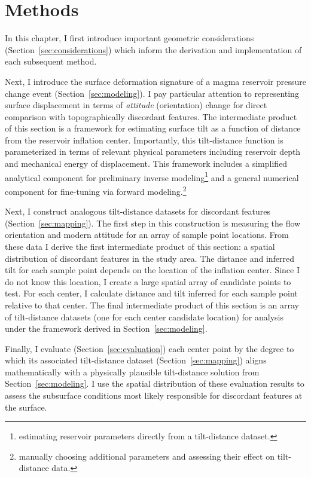 \chapter{Methods}\label{cha:methods}

In this chapter, I first introduce important geometric considerations (Section~\ref{sec:considerations}) which inform the derivation and implementation of each subsequent method.

Next, I introduce the surface deformation signature of a magma reservoir pressure change event (Section~\ref{sec:modeling}). I pay particular attention to representing surface displacement in terms of \emph{attitude} (orientation) change for direct comparison with topographically discordant features. The intermediate product of this section is a framework for estimating surface tilt as a function of distance from the reservoir inflation center. Importantly, this tilt-distance function is parameterized in terms of relevant physical parameters including reservoir depth and mechanical energy of displacement. This framework includes a simplified analytical component for preliminary inverse modeling\footnote{estimating reservoir parameters directly from a tilt-distance dataset.} and a general numerical component for fine-tuning via forward modeling.\footnote{manually choosing additional parameters and assessing their effect on tilt-distance data.}

Next, I construct analogous tilt-distance datasets for discordant features (Section~\ref{sec:mapping}). The first step in this construction is measuring the flow orientation and modern attitude for an array of sample point locations. From these data I derive the first intermediate product of this section: a spatial distribution of discordant features in the study area. The distance and inferred tilt for each sample point depends on the location of the inflation center. Since I do not know this location, I create a large spatial array of candidate points to test. For each center, I calculate distance and tilt inferred for each sample point relative to that center. The final intermediate product of this section is an array of tilt-distance datasets (one for each center candidate location) for analysis under the framework derived in Section~\ref{sec:modeling}.

Finally, I evaluate (Section~\ref{sec:evaluation}) each center point by the degree to which its associated tilt-distance dataset (Section~\ref{sec:mapping}) aligns mathematically with a physically plausible tilt-distance solution from Section~\ref{sec:modeling}. I use the spatial distribution of these evaluation results to assess the subsurface conditions most likely responsible for discordant features at the surface.





